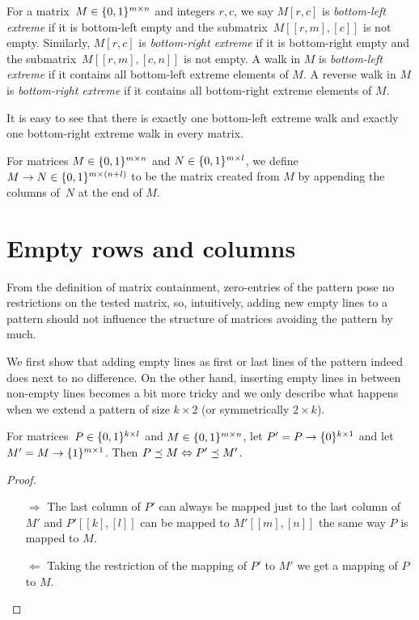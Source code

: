 \begin{defn}
For a matrix~$M\in\{0,1\}^{m\times n}$ and integers $r,c$, we say $M[r,c]$ is \emph{bottom-left extreme} if it is bottom-left empty and the submatrix~$M[[r,m],[c]]$ is not empty. Similarly, $M[r,c]$ is \emph{bottom-right extreme} if it is bottom-right empty and the submatrix~$M[[r,m],[c,n]]$ is not empty. A walk in $M$ is \emph{bottom-left extreme} if it contains all bottom-left extreme elements of $M$. A reverse walk in $M$ is \emph{bottom-right extreme} if it contains all bottom-right extreme elements of $M$.
\end{defn}

It is easy to see that there is exactly one bottom-left extreme walk and exactly one bottom-right extreme walk in every matrix.

\begin{defn}
For matrices $M\in\{0,1\}^{m\times n}$ and $N\in\{0,1\}^{m\times l}$, we define $M\rightarrow N\in\{0,1\}^{m\times(n+l)}$ to be the matrix created from $M$ by appending the columns of~$N$ at the end of $M$.
\end{defn}

\section{Empty rows and columns}
\label{sec:empty}
From the definition of matrix containment, zero-entries of the pattern pose no restrictions on the tested matrix, so, intuitively, adding new empty lines to a pattern should not influence the structure of matrices avoiding the pattern by much.

We first show that adding empty lines as first or last lines of the pattern indeed does next to no difference. On the other hand, inserting empty lines in between non-empty lines becomes a bit more tricky and we only describe what happens when we extend a pattern of size $k\times2$ (or symmetrically $2\times k$).

\begin{obs}
\label{obs:emptyrows}
For matrices~$P\in\{0,1\}^{k\times l}$ and $M\in\{0,1\}^{m\times n}$, let $P'=P\rightarrow\{0\}^{k\times1}$ and let $M'=M\rightarrow\{1\}^{m\times1}$. Then $P\preceq M\Leftrightarrow P'\preceq M'$.
\end{obs}
\begin{proof}
\begin{itemize}
	\item[$\Rightarrow$] The last column of $P'$ can always be mapped just to the last column of $M'$ and $P'[[k],[l]]$ can be mapped to $M'[[m],[n]]$ the same way $P$ is mapped to $M$.
	\item[$\Leftarrow$] Taking the restriction of the mapping of $P'$ to $M'$ we get a mapping of $P$ to $M$.
\end{itemize}
\end{proof}

